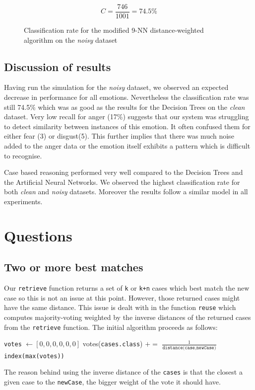 \documentclass[a4paper]{article}
\begin{document}
\begin{figure}[H]
\[ C = \frac{746}{1001} = 74.5\% \]
\caption{Classification rate for the modified 9-NN distance-weighted algorithm on the \emph{noisy} dataset}
\end{figure}

\subsection{Discussion of results}

Having run the simulation for the \emph{noisy} dataset, we observed an expected decrease in performance for all emotions. Nevertheless the classification rate was still 74.5\% which was as good as the results for the Decision Trees on the \emph{clean} dataset. Very low recall for anger (17\%) suggests that our system was struggling to detect similarity between instances of this emotion. It often confused them for either fear (3) or disgust(5). This further implies that there was much noise added to the anger data or the emotion itself exhibits a pattern which is difficult to recognise. \medskip

Case based reasoning performed very well compared to the Decision Trees and the Artificial Neural Networks. We observed the highest classification rate for both \emph{clean} and \emph{noisy} datasets. Moreover the results follow a similar model in all experiments.

\clearpage


\section{Questions}
\subsection{Two or more best matches}

Our \texttt{retrieve} function returns a set of \texttt{k} or \texttt{k+n} cases which best match the new case so this is not an issue at this point. However, those returned cases might have the same distance. This issue is dealt with in the function \texttt{reuse} which computes majority-voting weighted by the inverse distances of the returned cases from the \texttt{retrieve} function. The initial algorithm proceeds as follows: \medskip
\begin{algorithmic}
\State \texttt{votes} $\gets [0,0,0,0,0,0]$
     	\State votes(\texttt{cases.class}) $+=$ $\frac{1}{\texttt{distance(case,newCase})}$
     \EndFor \\
\Return \texttt{index(max(votes))} 
\end{algorithmic} \medskip
The reason behind using the inverse distance of the \texttt{cases} is that the closest a given case to the \texttt{newCase}, the bigger weight of the vote it should have.\medskip
\end{document}
